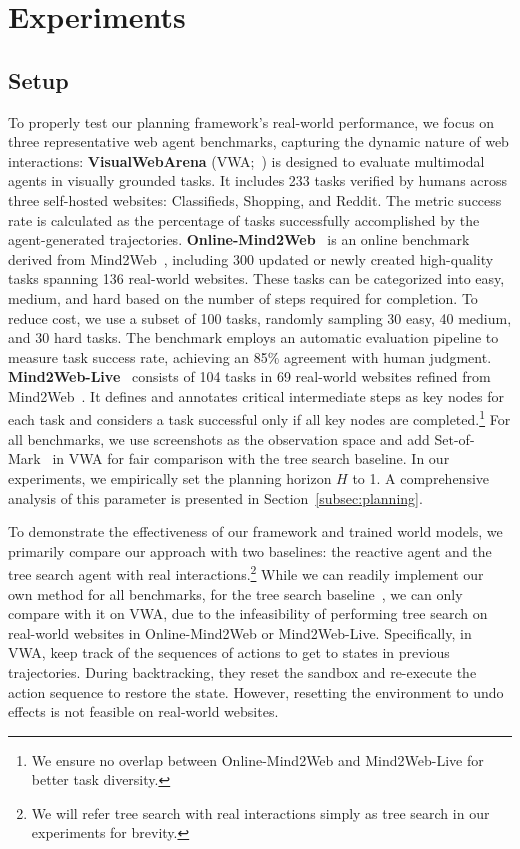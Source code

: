 \section{Experiments}
\label{sec:exp}
\subsection{Setup}


To properly test our planning framework's real-world performance, we focus on three representative web agent benchmarks, capturing the dynamic nature of web interactions: 
\noindent
\textbf{VisualWebArena} (VWA;~\cite{koh2024visualwebarena}) is designed to evaluate multimodal agents in visually grounded tasks. It includes 233 tasks verified by humans across three self-hosted websites: Classifieds, Shopping, and Reddit. The metric success rate is calculated as the percentage of tasks successfully accomplished by the agent-generated trajectories.
\noindent
\textbf{Online-Mind2Web}~\citep{m2wonline} is an online benchmark derived from Mind2Web~\citep{mind2web}, including 300 updated or newly created high-quality tasks spanning 136 real-world websites. 
These tasks can be categorized into easy, medium, and hard based on the number of steps required for completion. 
To reduce cost, we use a subset of 100 tasks, randomly sampling 30 easy, 40 medium, and 30 hard tasks.
The benchmark employs an automatic evaluation pipeline to measure task success rate, achieving an 85\% agreement with human judgment.
\noindent
\textbf{Mind2Web-Live}~\citep{webcanvas} consists of 104 tasks in 69 real-world websites refined from Mind2Web~\citep{mind2web}. 
It defines and annotates critical intermediate steps as key nodes for each task and considers a task successful only if all key nodes are completed.\footnote{We ensure no overlap between Online-Mind2Web and Mind2Web-Live for better task diversity.}
For all benchmarks, we use screenshots as the observation space and add Set-of-Mark~\citep{yang2023set} in VWA for fair comparison with the tree search baseline.
In our experiments, we empirically set the planning horizon $H$ to 1. A comprehensive analysis of this parameter is presented in Section~\ref{subsec:planning}.

To demonstrate the effectiveness of our framework and trained world models, we primarily compare our approach with two baselines: the reactive agent and the tree search agent with real interactions.\footnote{We will refer tree search with real interactions simply as tree search in our experiments for brevity.}
While we can readily implement our own method for all benchmarks, for the tree search baseline~\citep{koh2024tree}, we can only compare with it on VWA, due to the infeasibility of performing tree search on real-world websites in Online-Mind2Web or Mind2Web-Live.
Specifically, in VWA, \cite{koh2024tree} keep track of the sequences of actions to get to states in previous trajectories.
During backtracking, they reset the sandbox and re-execute the action sequence to restore the state. 
However, resetting the environment to undo effects is not feasible on real-world websites.

